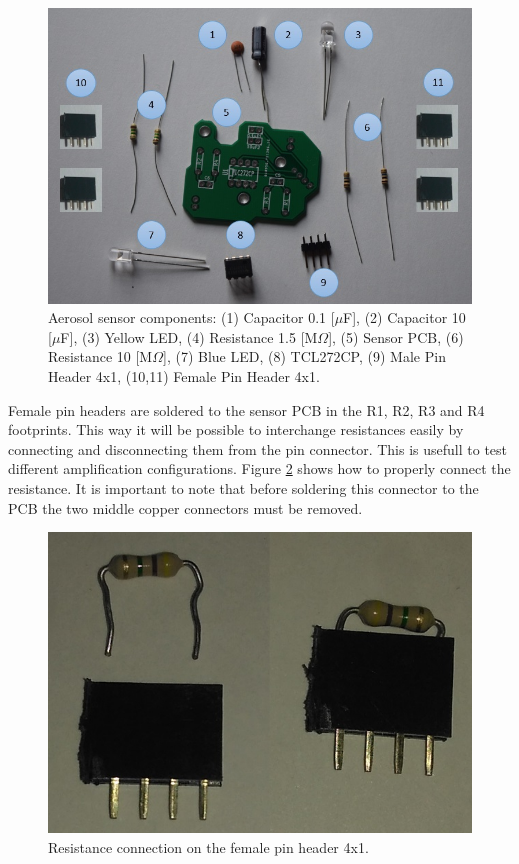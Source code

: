 \documentclass[12pt,letterpaper]{article}
\numberwithin{figure}{section}
\numberwithin{equation}{section}
\numberwithin{table}{section}
\begin{document}
\begin{figure}[H]
    \centering
    \includegraphics[scale=0.75]{Figuras/figure_3.jpg}
    \caption{Aerosol sensor components: (1) Capacitor 0.1 [$\mu$F], (2) Capacitor 10 [$\mu$F], (3) Yellow LED, (4) Resistance 1.5 [M$\Omega$], (5) Sensor PCB, (6) Resistance 10 [M$\Omega$], (7) Blue LED, (8) TCL272CP, (9) Male Pin Header 4x1, (10,11) Female Pin Header 4x1.}
    \label{fig:3}
\end{figure}

Female pin headers are soldered to the sensor PCB in the R1, R2, R3 and R4 footprints. This way it will be possible to interchange resistances easily by connecting and disconnecting them from the pin connector. This is usefull to test different amplification configurations. Figure \ref{fig:4} shows how to properly connect the resistance. It is important to note that before soldering this connector to the PCB the two middle copper connectors must be removed.

\begin{figure}[H]
    \centering
    \includegraphics[scale=0.5]{Figuras/figure_4.jpg}
    \caption{Resistance connection on the female pin header 4x1.}
    \label{fig:4}
\end{figure}
\end{document}
